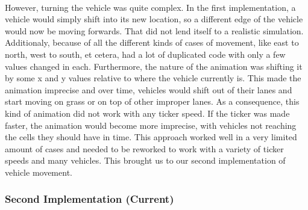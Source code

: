 \documentclass[a4paper,11pt,titlepage]{article}
\begin{document}
\paragraph{}
However, turning the vehicle was quite complex. In the first implementation, a vehicle would simply shift into its new location, so a different edge of the vehicle would now be moving forwards. That did not lend itself to a realistic simulation. Additionaly, because of all the different kinds of cases of movement, like east to north, west to south, et cetera, had a lot of duplicated code with only a few values changed in each. Furthermore, the nature of the animation was shifting it by some x and y values relative to where the vehicle currently is. This made the animation imprecise and over time, vehicles would shift out of their lanes and start moving on grass or on top of other improper lanes. As a consequence, this kind of animation did not work with any ticker speed. If the ticker was made faster, the animation would become more imprecise, with vehicles not reaching the cells they should have in time. This approach worked well in a very limited amount of cases and needed to be reworked to work with a variety of ticker speeds and many vehicles. This brought us to our second implementation of vehicle movement.

\subsubsection{Second Implementation (Current)}
\end{document}
